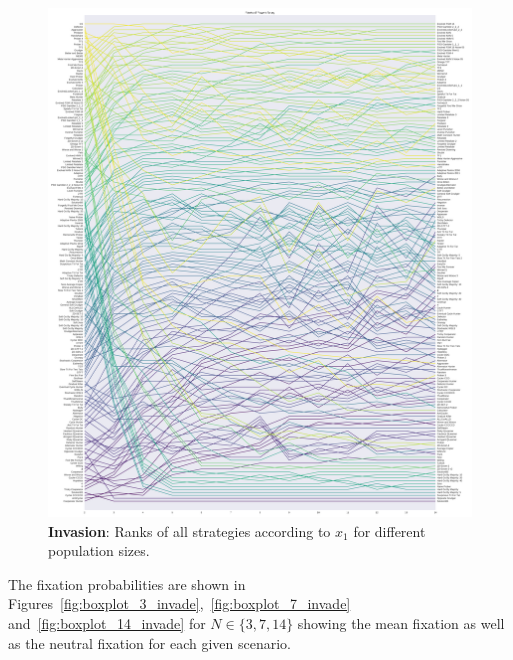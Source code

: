 \documentclass[10pt,journal]{IEEEtran}
\begin{document}
\begin{figure}[!hbtp]
    \centering
    \includegraphics[width=\columnwidth]{img/average_rank_vs_population_size_invade.pdf}
    \caption{\textbf{Invasion}: Ranks of all strategies according to \(x_1\) for different
    population sizes.}
    \label{fig:ranks_v_size_invade}
\end{figure}

The fixation
probabilities are shown in
Figures~\ref{fig:boxplot_3_invade},~\ref{fig:boxplot_7_invade}
and~\ref{fig:boxplot_14_invade} for \(N\in\{3, 7, 14\}\) showing the mean
fixation as well as the neutral fixation for each given scenario.
\end{document}
